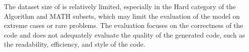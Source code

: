 The dataset size of \benchmark is relatively limited, especially in the Hard category of the Algorithm and MATH subsets, which may limit the evaluation of the model on extreme cases or rare problems. The evaluation focuses on the correctness of the code and does not adequately evaluate the quality of the generated code, such as the readability, efficiency, and style of the code.
